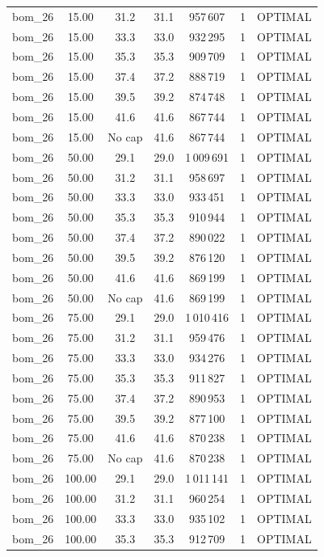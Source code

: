 \begin{table}[!htbp]
\begin{tabular}{lcccccc}
bom\_26 & 15.00 & 31.2 & 31.1 & 957\,607 & 1 & OPTIMAL \\
bom\_26 & 15.00 & 33.3 & 33.0 & 932\,295 & 1 & OPTIMAL \\
bom\_26 & 15.00 & 35.3 & 35.3 & 909\,709 & 1 & OPTIMAL \\
bom\_26 & 15.00 & 37.4 & 37.2 & 888\,719 & 1 & OPTIMAL \\
bom\_26 & 15.00 & 39.5 & 39.2 & 874\,748 & 1 & OPTIMAL \\
bom\_26 & 15.00 & 41.6 & 41.6 & 867\,744 & 1 & OPTIMAL \\
bom\_26 & 15.00 & No cap & 41.6 & 867\,744 & 1 & OPTIMAL \\
bom\_26 & 50.00 & 29.1 & 29.0 & 1\,009\,691 & 1 & OPTIMAL \\
bom\_26 & 50.00 & 31.2 & 31.1 & 958\,697 & 1 & OPTIMAL \\
bom\_26 & 50.00 & 33.3 & 33.0 & 933\,451 & 1 & OPTIMAL \\
bom\_26 & 50.00 & 35.3 & 35.3 & 910\,944 & 1 & OPTIMAL \\
bom\_26 & 50.00 & 37.4 & 37.2 & 890\,022 & 1 & OPTIMAL \\
bom\_26 & 50.00 & 39.5 & 39.2 & 876\,120 & 1 & OPTIMAL \\
bom\_26 & 50.00 & 41.6 & 41.6 & 869\,199 & 1 & OPTIMAL \\
bom\_26 & 50.00 & No cap & 41.6 & 869\,199 & 1 & OPTIMAL \\
bom\_26 & 75.00 & 29.1 & 29.0 & 1\,010\,416 & 1 & OPTIMAL \\
bom\_26 & 75.00 & 31.2 & 31.1 & 959\,476 & 1 & OPTIMAL \\
bom\_26 & 75.00 & 33.3 & 33.0 & 934\,276 & 1 & OPTIMAL \\
bom\_26 & 75.00 & 35.3 & 35.3 & 911\,827 & 1 & OPTIMAL \\
bom\_26 & 75.00 & 37.4 & 37.2 & 890\,953 & 1 & OPTIMAL \\
bom\_26 & 75.00 & 39.5 & 39.2 & 877\,100 & 1 & OPTIMAL \\
bom\_26 & 75.00 & 41.6 & 41.6 & 870\,238 & 1 & OPTIMAL \\
bom\_26 & 75.00 & No cap & 41.6 & 870\,238 & 1 & OPTIMAL \\
bom\_26 & 100.00 & 29.1 & 29.0 & 1\,011\,141 & 1 & OPTIMAL \\
bom\_26 & 100.00 & 31.2 & 31.1 & 960\,254 & 1 & OPTIMAL \\
bom\_26 & 100.00 & 33.3 & 33.0 & 935\,102 & 1 & OPTIMAL \\
bom\_26 & 100.00 & 35.3 & 35.3 & 912\,709 & 1 & OPTIMAL \\

\end{tabular}
\end{table}
